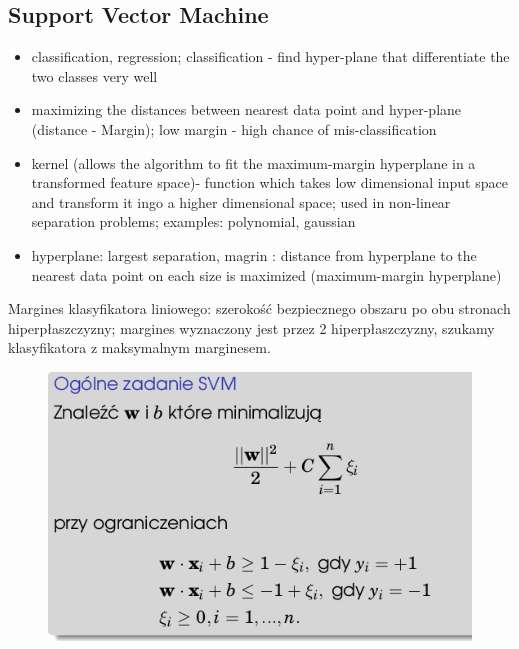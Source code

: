 \documentclass[10pt,a4paper]{article}
\begin{document}
\subsection{Support Vector Machine}
  \begin{itemize}
    \item classification, regression; classification - find hyper-plane that differentiate the two classes very well
    \item maximizing the distances between nearest data point and hyper-plane (distance - Margin); low margin - high chance of mis-classification
    \item kernel (allows the algorithm to fit the maximum-margin hyperplane in a transformed feature space)- function which takes low dimensional input space and transform it ingo a higher dimensional space; used in non-linear separation problems; examples: polynomial, gaussian
    \item hyperplane: largest separation, magrin : distance from hyperplane to the nearest data point on each size is maximized (maximum-margin hyperplane)
  \end{itemize}
Margines klasyfikatora liniowego: szerokość bezpiecznego obszaru po obu stronach hiperpłaszczyzny; margines wyznaczony jest przez 2 hiperpłaszczyzny, szukamy klasyfikatora z maksymalnym marginesem.
\begin{figure}[H]
  \centering
    \includegraphics[scale=0.50]{images/zadSVM.png}
\end{figure}
\end{document}
